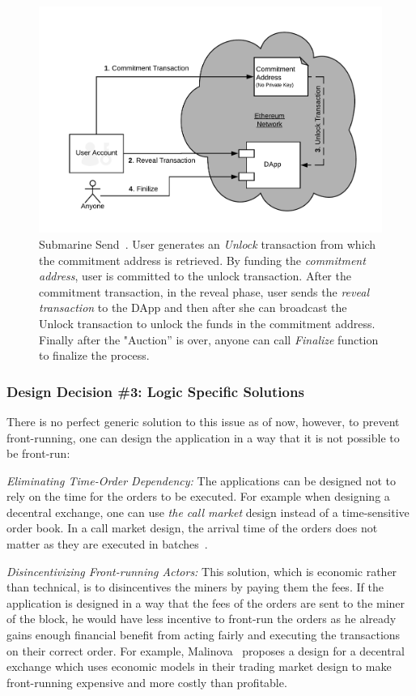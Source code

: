 \begin{figure}[h]
\centering
\includegraphics[width=0.5\linewidth]{figures/LibSubmarine.png}
\caption{Submarine Send~\cite{libsubmarine}. User generates an \textit{Unlock} transaction from which the commitment address is retrieved. By funding the \textit{commitment address}, user is committed to the unlock transaction. After the commitment transaction, in the reveal phase, user sends the \textit{reveal transaction} to the DApp and then after she can broadcast the Unlock transaction to unlock the funds in the commitment address. Finally after the "Auction'' is over, anyone can call \textit{Finalize} function to finalize the process.  \label{fig:LibSubmarine}}
\end{figure}


\subsubsection{Design Decision \#3: Logic Specific Solutions\newline}
There is no perfect generic solution to this issue as of now, however, to prevent front-running, one can design the application in a way that it is not possible to be front-run:

\noindent\emph{Eliminating Time-Order Dependency:} The applications can be designed not to rely on the time for the orders to be executed. For example when designing a decentral exchange, one can use \emph{the call market} design instead of a time-sensitive order book. In a call market design, the arrival time of the orders does not matter as they are executed in batches~\cite{clark2014decentralizing}. 

\noindent\emph{Disincentivizing Front-running Actors:} This solution, which is economic rather than technical, is to disincentives the miners by paying them the fees. If the application is designed in a way that the fees of the orders are sent to the miner of the block, he would have less incentive to front-run the orders as he already gains enough financial benefit from acting fairly and executing the transactions on their correct order. For example, Malinova~\cite{malinova2017market} proposes a design for a decentral exchange which uses economic models in their trading market design to make front-running expensive and more costly than profitable. 


